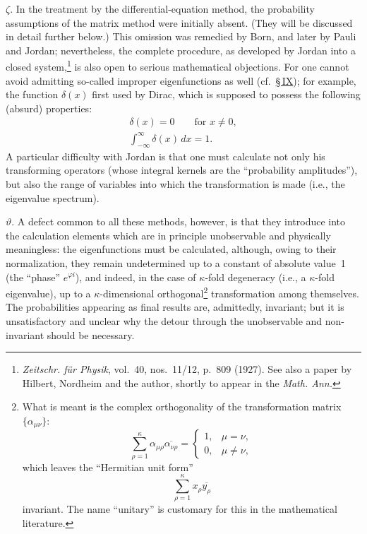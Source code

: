 \documentclass[fontsize=13pt,paper=b5,twoside,bookmarkpackage=false]{scrartcl}
\newcommand{\Sec}[1]{\hyperref[sec:#1]{\S\,#1}}
\begin{document}
\par\noindent $\zeta$. In the treatment by the differential-equation method, the probability assumptions of the matrix method were initially absent. (They will be discussed in detail further below.) This omission was remedied by Born, and later by Pauli and Jordan; nevertheless, the complete procedure, as developed by Jordan into a closed system,\footnote[7]{\label{fn:7}\emph{Zeitschr. für Physik}, vol.~40, nos.~11/12, p.~809 (1927). See also a paper by Hilbert, Nordheim and the author, shortly to appear in the \emph{Math. Ann.}} is also open to serious mathematical objections. For one cannot avoid admitting so-called improper eigenfunctions as well (cf.\ \Sec{IX}); for example, the function $\delta(x)$ first used by Dirac, which is supposed to possess the following (absurd) properties:
\begin{gather*}
\delta(x)=0\qquad\text{for }x\ne0,\\
\int_{-\infty}^{\infty}\delta(x)\,dx=1.
\end{gather*}
A particular difficulty with Jordan is that one must calculate not only his transforming operators (whose integral kernels are the ``probability amplitudes''), but also the range of variables into which the transformation is made (i.e., the eigenvalue spectrum).

\par\noindent $\vartheta$. A defect common to all these methods, however, is that they introduce into the calculation elements which are in principle unobservable and physically meaningless: the eigenfunctions must be calculated, although, owing to their normalization, they remain undetermined up to a constant of absolute value~1 (the ``phase'' $e^{\varphi i}$), and indeed, in the case of $\kappa$-fold degeneracy (i.e., a $\kappa$-fold eigenvalue), up to a $\kappa$-dimensional orthogonal\footnote[8]{\label{fn:8}What is meant is the complex orthogonality of the transformation matrix $\{\alpha_{\mu\nu}\}$:
\[
\sum_{\rho=1}^{\kappa}\alpha_{\mu\rho}\overline{\alpha_{\nu\rho}}
=\begin{cases}1,&\mu=\nu,\\0,&\mu\ne\nu,\end{cases}
\]
which leaves the ``Hermitian unit form''
\[
\sum_{\rho=1}^{\kappa}x_\rho\overline{y_\rho}
\]
invariant. The name ``unitary'' is customary for this in the mathematical literature.} transformation among themselves. The probabilities appearing as final results are, admittedly, invariant; but it is unsatisfactory and unclear why the detour through the unobservable and non-invariant should be necessary.
\end{document}
